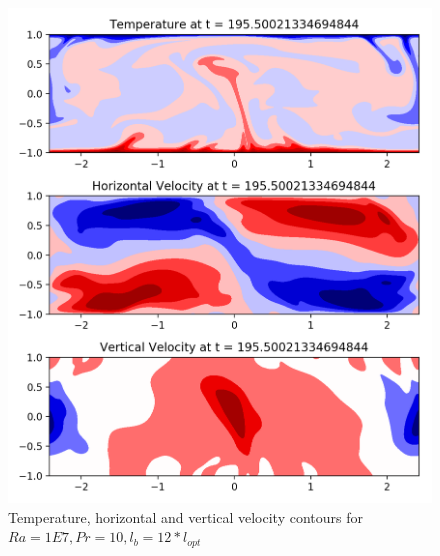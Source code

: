 \documentclass[12pt]{article}
\begin{document}
     \begin{figure}[!htb]
     	\includegraphics[width=\linewidth]{contours_1E7_10_12.png}
     	\caption{Temperature, horizontal and vertical velocity contours for $Ra = 1E7, Pr =10, l_b = 12* l_{opt} $ }
     	\label{fig:fig20}
     \end{figure}
     
\end{document}

